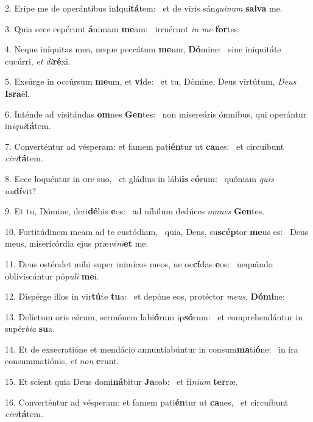 2. Eripe me de operántibus in\textbf{i}qui\textbf{tá}tem: \ast\  et de viris sán\textit{gui}\textit{num} \textbf{sal}\textbf{va} me.\

3. Quia ecce cepérunt \textbf{á}nimam \textbf{me}am: \ast\  irruérunt \textit{in} \textit{me} \textbf{for}tes.\

4. Neque iníquitas mea, neque peccátum \textbf{me}um, \textbf{Dó}mine: \ast\  sine iniquitáte cucúrri, \textit{et} \textit{di}\textbf{ré}xi.\

5. Exsúrge in occúrsum \textbf{me}um, et \textbf{vi}de: \ast\  et tu, Dómine, Deus virtútum, \textit{De}\textit{us} \textbf{Is}\textbf{ra}ël.\

6. Inténde ad visitándas \textbf{om}nes \textbf{Gen}tes: \ast\  non misereáris ómnibus, qui operántur in\textit{i}\textit{qui}\textbf{tá}tem.\

7. Converténtur ad vésperam: et famem pati\textbf{én}tur ut \textbf{ca}nes: \ast\  et circuíbunt \textit{ci}\textit{vi}\textbf{tá}tem.\

8. Ecce loquéntur in ore suo, \dag\  et gládius in lábi\textbf{is} e\textbf{ó}rum: \ast\  quóniam \textit{quis} \textit{au}\textbf{dí}vit?\

9. Et tu, Dómine, deri\textbf{dé}bis \textbf{e}os: \ast\  ad níhilum dedúces \textit{om}\textit{nes} \textbf{Gen}tes.\

10. Fortitúdinem meam ad te custódiam, \dag\  quia, Deus, su\textbf{scép}tor \textbf{me}us es: \ast\  Deus meus, misericórdia ejus præ\textit{vé}\textit{ni}\textbf{et} me.\

11. Deus osténdet mihi super inimícos meos, ne oc\textbf{cí}das \textbf{e}os: \ast\  nequándo obliviscántur pó\textit{pu}\textit{li} \textbf{me}i.\

12. Dispérge illos in vir\textbf{tú}te \textbf{tu}a: \ast\  et depóne eos, protéctor \textit{me}\textit{us}, \textbf{Dó}\textbf{mi}ne:\

13. Delíctum oris eórum, sermónem labi\textbf{ó}rum ip\textbf{só}rum: \ast\  et comprehendántur in supér\textit{bi}\textit{a} \textbf{su}a.\

14. Et de exsecratióne et mendácio annuntiabúntur in consum\textbf{ma}ti\textbf{ó}ne: \ast\  in ira consummatiónis, \textit{et} \textit{non} \textbf{e}runt.\

15. Et scient quia Deus domi\textbf{ná}bitur \textbf{Ja}cob: \ast\  et fí\textit{ni}\textit{um} \textbf{ter}ræ.\

16. Converténtur ad vésperam: et famem pati\textbf{én}tur ut \textbf{ca}nes, \ast\  et circuíbunt \textit{ci}\textit{vi}\textbf{tá}tem.\

